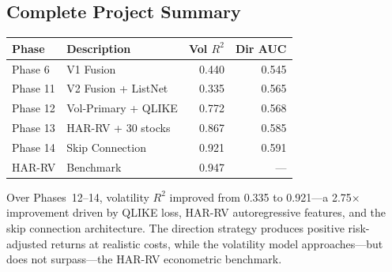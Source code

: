 \documentclass[12pt,a4paper]{article}
\begin{document}
\subsection{Complete Project Summary}

\begin{center}
\begin{tabular}{l l r r}
\hline
\textbf{Phase} & \textbf{Description} & \textbf{Vol $R^2$} & \textbf{Dir AUC} \\
\hline
Phase 6  & V1 Fusion               & 0.440 & 0.545 \\
Phase 11 & V2 Fusion + ListNet     & 0.335 & 0.565 \\
Phase 12 & Vol-Primary + QLIKE     & 0.772 & 0.568 \\
Phase 13 & HAR-RV + 30 stocks      & 0.867 & 0.585 \\
Phase 14 & Skip Connection         & 0.921 & 0.591 \\
HAR-RV   & Benchmark               & 0.947 & --- \\
\hline
\end{tabular}
\end{center}

Over Phases~12--14, volatility $R^2$ improved from 0.335 to 0.921—a 2.75$\times$
improvement driven by QLIKE loss, HAR-RV autoregressive features, and the skip
connection architecture.  The direction strategy produces positive risk-adjusted
returns at realistic costs, while the volatility model approaches—but does not
surpass—the HAR-RV econometric benchmark.
\end{document}
